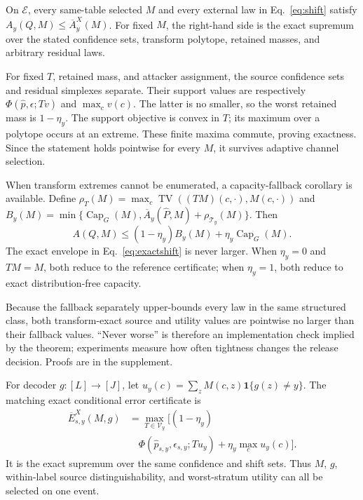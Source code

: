 \begin{theorem}
On $\mathcal E$, every same-table selected $M$ and every external law in
Eq.~\eqref{eq:shift} satisfy $A_y(Q,M)\leq\overline A_y^X(M)$. For fixed $M$,
the right-hand side is the exact supremum over the stated confidence sets,
transform polytope, retained masses, and arbitrary residual laws.
\end{theorem}

For fixed $T$, retained mass, and attacker assignment, the source confidence
sets and residual simplexes separate. Their support values are respectively
$\Phi(\widehat p,\epsilon;Tv)$ and $\max_cv(c)$. The latter is no smaller, so
the worst retained mass is $1-\eta_y$. The support objective is convex in $T$;
its maximum over a polytope occurs at an extreme. These finite maxima commute,
proving exactness. Since the statement holds pointwise for every $M$, it
survives adaptive channel selection.

When transform extremes cannot be enumerated, a capacity-fallback corollary is
available. Define
$\rho_T(M)=\max_c\operatorname{TV}((TM)(c,\cdot),M(c,\cdot))$ and
$B_y(M)=\min\{\operatorname{Cap}_G(M),
\overline A_y(\widehat P,M)+\rho_{\mathcal T_y}(M)\}$. Then
\begin{equation}
 A(Q,M)\leq(1-\eta_y)B_y(M)+\eta_y\operatorname{Cap}_G(M).
 \label{eq:transferbound}
\end{equation}
The exact envelope in Eq.~\eqref{eq:exactshift} is never larger. When
$\eta_y=0$ and $TM=M$, both reduce to the reference certificate; when
$\eta_y=1$, both reduce to exact distribution-free capacity.

Because the fallback separately upper-bounds every law in the same structured
class, both transform-exact source and utility values are pointwise no larger
than their fallback values. ``Never worse'' is therefore an implementation
check implied by the theorem; experiments measure how often tightness changes
the release decision. Proofs are in the supplement.

For decoder $g:[L]\to[J]$, let
$u_y(c)=\sum_zM(c,z)\mathbf 1\{g(z)\neq y\}$. The matching exact conditional
error certificate is
\begin{equation}
 \begin{aligned}
 \overline E^X_{s,y}(M,g)
 &=\max_{T\in\mathcal V_y}\Big[
 (1-\eta_y)\\[-2pt]
 &\quad\Phi(\widehat p_{s,y},\epsilon_{s,y};Tu_y)
 +\eta_y\max_cu_y(c)\Big].
 \end{aligned}
 \label{eq:exactutility}
\end{equation}
It is the exact supremum over the same confidence and shift sets. Thus $M$,
$g$, within-label source distinguishability, and worst-stratum utility can all
be selected on one event.

